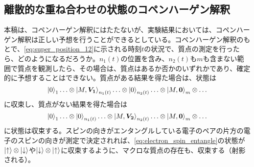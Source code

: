 \subsection{離散的な重ね合わせの状態のコペンハーゲン解釈}
本稿は、コペンハーゲン解釈にはたたないが、実験結果においては、コペンハーゲン解釈は正しい予想を行うことができるとしている。コペンハーゲン解釈のもとで、\eqref{eq:super_position_12}に示される時刻$t$の状況で、質点の測定を行ったら、どのようになるだろうか。$n_1(t)$の位置を含み、$n_2(t)$も$m$も含まない範囲で質点を観測したら、その場合は、質点はあるか否かのいずれかであり、確定的に予想することはできない。質点がある結果を得た場合は、状態は
\begin{equation}
    \ket{0}_1 \ldots \otimes \ket{M,\bm{V_1}}_{n_1(t)} \ldots \otimes \ket{0}_{n_2(t)}  \ldots \otimes \ket{M,\bm{0}}_m \otimes\ldots 
\end{equation}
に収束し、質点がない結果を得た場合は
\begin{equation}
    \ket{0}_1 \ldots \otimes \ket{0}_{n_1(t)} \ldots \otimes \ket{M,\bm{V_2}}_{n_2(t)}  \ldots \otimes \ket{M,\bm{0}}_m \otimes \ldots \nonumber
\end{equation}
に状態は収束する。スピンの向きがエンタングルしている電子のペアの片方の電子のスピンの向きが測定で決定されれば、\eqref{eq:electron_spin_entangle}の状態が$\ket{\uparrow} \otimes \ket{\downarrow}$や$\ket{\downarrow} \otimes \ket{\uparrow}$に収束するように、マクロな質点の存在も、収束する（射影される）。
